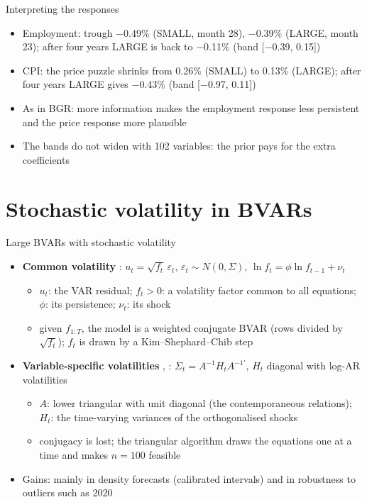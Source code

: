 \begin{frame}{Interpreting the responses}
\itemsize{\small}
\begin{itemize}
    \item Employment: trough \ensuremath{-}0.49\% (SMALL, month 28), \ensuremath{-}0.39\% (LARGE, month 23); after four years LARGE is back to \ensuremath{-}0.11\% (band [\ensuremath{-}0.39, 0.15])
    \item CPI: the price puzzle shrinks from 0.26\% (SMALL) to 0.13\% (LARGE); after four years LARGE gives \ensuremath{-}0.43\% (band [\ensuremath{-}0.97, 0.11])
    \item As in BGR: more information makes the employment response less persistent and the price response more plausible
    \item The bands do not widen with 102 variables: the prior pays for the extra coefficients
\end{itemize}
\end{frame}


\section{Stochastic volatility in BVARs}

\begin{frame}{Large BVARs with stochastic volatility}
\itemsize{\small}
\begin{itemize}
    \item \textbf{Common volatility} : $u_t = \sqrt{f_t}\,\varepsilon_t$, $\varepsilon_t \sim N(0, \Sigma)$, $\ln f_t = \phi\ln f_{t-1} + \nu_t$
    \begin{itemize}
        \item $u_t$: the VAR residual; $f_t > 0$: a volatility factor common to all equations; $\phi$: its persistence; $\nu_t$: its shock
        \item given $f_{1:T}$, the model is a weighted conjugate BVAR (rows divided by $\sqrt{f_t}$); $f_t$ is drawn by a Kim--Shephard--Chib step
    \end{itemize}
    \item \textbf{Variable-specific volatilities} , : $\Sigma_t = A^{-1}H_tA^{-1\prime}$, $H_t$ diagonal with log-AR volatilities 
    \begin{itemize}
        \item $A$: lower triangular with unit diagonal (the contemporaneous relations); $H_t$: the time-varying variances of the orthogonalised shocks
        \item conjugacy is lost; the triangular algorithm draws the equations one at a time and makes $n = 100$ feasible
    \end{itemize}
    \item Gains: mainly in density forecasts (calibrated intervals) and in robustness to outliers such as 2020
\end{itemize}
\end{frame}

